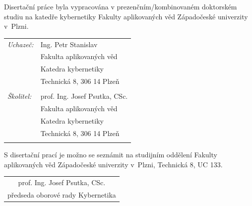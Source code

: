 \newpage

\thispagestyle{empty}
\noindent Disertační práce byla vypracována v prezenčním/kombinovaném doktorském studiu na katedře kybernetiky Fakulty aplikovaných věd Západočeské univerzity v~Plzni. \\
\vspace{8mm}
\begin{flushleft}
  \begin{tabular}{ll}
     \textit{Uchazeč:}  & Ing. Petr Stanislav\\
                        & Fakulta aplikovaných věd\\
                        & Katedra kybernetiky\\
                        & Technická 8, 306 14 Plzeň\\
                        & \\
     \textit{Školitel:} & prof. Ing. Josef Psutka, CSc.\\
                        & Fakulta aplikovaných věd\\
                        & Katedra kybernetiky\\
                        & Technická 8, 306 14 Plzeň\\
                        & \\
\end{tabular}
\end{flushleft}
%
\vfill

\noindent S disertační prací je možno se seznámit na studijním oddělení
Fakulty aplikovaných věd Západočeské univerzity v~Plzni, Technická 8, UC 133. \\
\vspace{8mm}
\begin{flushright}
  \begin{tabular}{c}
   prof. Ing. Josef Psutka, CSc.\\
   předseda oborové rady Kybernetika
  \end{tabular}
\end{flushright}


\ifdefined\CELE
\else

\fi
